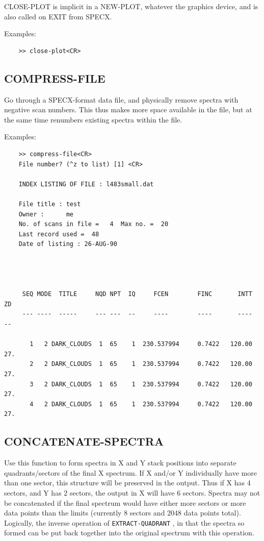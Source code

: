 \documentclass[11pt,twoside]{report}
\begin{document}
CLOSE-PLOT  is implicit in a NEW-PLOT,
whatever the graphics device, and is also called on EXIT from SPECX. 

Examples:
\begin{verbatim}
    >> close-plot<CR>
\end{verbatim}

\subsection{COMPRESS-FILE} 

Go through a SPECX-format data file, and physically remove spectra with
negative scan numbers. This thus makes more space available in the file,
but at the same time renumbers existing spectra within the file.

Examples:
\begin{verbatim}
    >> compress-file<CR>
    File number? (^z to list) [1] <CR>

    INDEX LISTING OF FILE : l483small.dat                           

    File title : test                                    
    Owner :      me          
    No. of scans in file =   4  Max no. =  20
    Last record used =  48
    Date of listing : 26-AUG-90




     SEQ MODE  TITLE     NQD NPT  IQ     FCEN        FINC       INTT    ZD
     --- ----  -----     --- ---  --     ----        ----       ----    --

       1   2 DARK_CLOUDS  1  65    1  230.537994     0.7422   120.00    27.
       2   2 DARK_CLOUDS  1  65    1  230.537994     0.7422   120.00    27.
       3   2 DARK_CLOUDS  1  65    1  230.537994     0.7422   120.00    27.
       4   2 DARK_CLOUDS  1  65    1  230.537994     0.7422   120.00    27.
\end{verbatim}

\subsection{CONCATENATE-SPECTRA} 

Use this function to form spectra in X and Y stack positions into separate
quadrants/sectors of the final X spectrum. If X and/or Y individually have more
than one sector, this structure will be preserved in the output. Thus if X has
4 sectors, and Y has 2 sectors, the output in X will have 6 sectors. Spectra
may not be concatenated if the final spectrum would have either more sectors or
more data points than the limits (currently 8 sectors and 2048 data points
total). Logically, the inverse operation of \verb+EXTRACT-QUADRANT+
, in that the spectra so formed can be put back
together into the original spectrum with this operation. 
\end{document}

